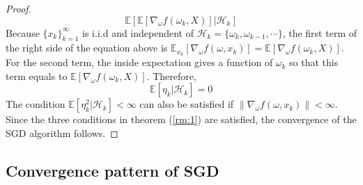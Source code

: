 \begin{proof}
\begin{equation*}
      \mathbb{E}[\mathbb{E}[\nabla_{\omega}f(\omega_{k},X)]|\mathcal{H}_{k}]
    \end{equation*}
    Because $\{x_{k}\}_{k=1}^{\infty}$ is i.i.d and independent of $\mathcal{H}_{k}=\{\omega_{k},\omega_{k-1},\cdots\}$,
    the first term of the right side of the equation above is
    $\mathbb{E}_{x_{k}}[\nabla_{\omega}f(\omega,x_{k})]=\mathbb{E}[\nabla_{\omega}f(\omega_{k},X)]$. For the second term,
    the inside expectation gives a function of $\omega_{k}$ so that this term equals to  $\mathbb{E}[\nabla_{\omega}f(\omega_{k},X)]$. Therefore,
    \begin{equation*}
      \mathbb{E}[\eta_{k}|\mathcal{H}_{k}] = 0
    \end{equation*}
    The condition $\mathbb{E}[\eta_{k}^{2}|\mathcal{H}_{k}]<\infty$ can also be satisfied if
    $\|\nabla_{\omega}f(\omega,x_{k})\|<\infty$. Since the three conditions in theorem (\ref{rm:1}) are satisfied, the
    convergence of the SGD algorithm follows.
  \end{proof}

  \subsection{Convergence pattern of SGD}


